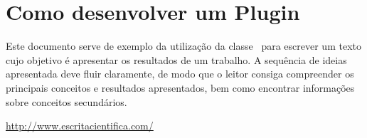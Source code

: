 \chapter{Como desenvolver um Plugin}%
Este documento serve de exemplo da utilização da classe \unbcic\ para escrever um texto cujo objetivo é apresentar os resultados de um trabalho. A sequência de ideias apresentada deve fluir claramente, de modo que o leitor consiga compreender os principais conceitos e resultados apresentados, bem como encontrar informações sobre conceitos secundários.

\url{http://www.escritacientifica.com/}